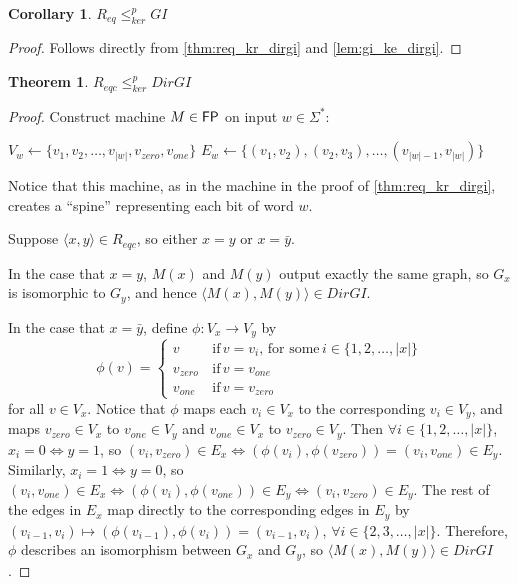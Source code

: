 \documentclass{article}
\newtheorem{theorem}{Theorem}[section]
\newtheorem{corollary}[corollary]{Corollary}
\theoremstyle{definition} \newtheorem{definition}[definition]{Definition}
\newcommand{\plain}[1]{\,\text{#1}\,} %
\newcommand{\sigmastar}{\Sigma^{*}} %
\newcommand{\kr}{\leq^{p}_{ker}} %
\newcommand{\pair}[2]{\langle#1,#2\rangle} %
\begin{document}
\begin{corollary}$R_{eq}\kr GI$\end{corollary}
\begin{proof}Follows directly from \autoref{thm:req_kr_dirgi} and
  \autoref{lem:gi_ke_dirgi}.\end{proof}

\begin{theorem}\label{thm:reqi_kr_dirgi}$R_{eqc}\kr DirGI$\end{theorem}
\begin{proof}
  Construct machine $M\in {\ensuremath{\mathsf{FP}}}$ on input $w\in\sigmastar$:\\
  \begin{algorithm}[H]
    $V_w\gets\{v_1, v_2, \ldots, v_{|w|}, v_{zero}, v_{one}\}$\;
    $E_w\gets\{(v_1, v_2), (v_2, v_3), \ldots, (v_{|w|-1},
    v_{|w|})\}$\;
  \end{algorithm}
  Notice that this machine, as in the machine in the proof of
  \autoref{thm:req_kr_dirgi}, creates a ``spine'' representing each bit of word
  $w$.

  Suppose $\pair{x}{y}\in R_{eqc}$, so either $x=y$ or $x=\bar{y}$.

  In the case that $x=y$, $M(x)$ and $M(y)$ output exactly the same graph, so
  $G_x$ is isomorphic to $G_y$, and hence $\pair{M(x)}{M(y)}\in DirGI$.

  In the case that $x=\bar{y}$, define $\phi\colon V_x\to V_y$ by
  \begin{displaymath}
    \phi(v)=
    \begin{cases}
      v & \plain{if} v = v_i, \plain{for some} i\in\{1, 2, \ldots, |x|\}\\
      v_{zero} & \plain{if} v = v_{one}\\
      v_{one} & \plain{if} v = v_{zero}
    \end{cases}
  \end{displaymath}
  for all $v\in V_x$. Notice that $\phi$ maps each $v_i\in V_x$ to the
  corresponding $v_i\in V_y$, and maps $v_{zero}\in V_x$ to $v_{one}\in V_y$
  and $v_{one}\in V_x$ to $v_{zero}\in V_y$. Then $\forall
  i\in\{1,2,\ldots,|x|\}$, $x_i=0 \iff y=1$, so $(v_i, v_{zero})\in E_x \iff
  (\phi(v_i), \phi(v_{zero})) = (v_i, v_{one})\in E_y$. Similarly, $x_i=1 \iff
  y=0$, so $(v_i, v_{one})\in E_x \iff (\phi(v_i), \phi(v_{one}))\in E_y \iff
  (v_i, v_{zero})\in E_y$. The rest of the edges in $E_x$ map directly to the
  corresponding edges in $E_y$ by $(v_{i-1}, v_i) \mapsto (\phi(v_{i-1}),
  \phi(v_i))=(v_{i-1}, v_i)$, $\forall i\in\{2,3,\ldots,|x|\}$. Therefore,
  $\phi$ describes an isomorphism between $G_x$ and $G_y$, so
  $\pair{M(x)}{M(y)}\in DirGI$.


\end{proof}
\end{document}
